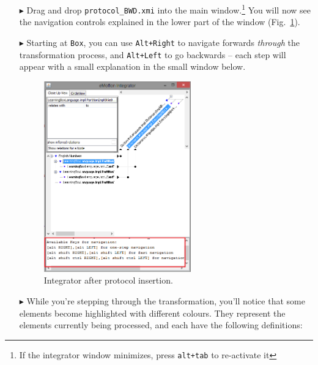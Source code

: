 \begin{itemize}
\item[$\blacktriangleright$] Drag and drop \texttt{protocol\_BWD.xmi} into the main window.\footnote{If the integrator window minimizes, press \texttt{alt+tab}
to re-activate it} You will now see the navigation controls explained in the lower part of the window (Fig.~\ref{fig:integrator_after_protocol}).

\vspace{0.5cm}

\item[$\blacktriangleright$]  Starting at \texttt{Box}, you can use \texttt{Alt+Right} to navigate forwards \emph{through} the transformation process, and
\texttt{Alt+Left} to go backwards -- each step will appear with a small explanation in the small window below.

\newpage

\begin{figure}[h!]
\begin{center}
  \includegraphics[width=0.6\textwidth]{integrator_after_protocol_insertion.png}
  \caption{Integrator after protocol insertion.}
  \label{fig:integrator_after_protocol}
\end{center}
\end{figure} 

\item[$\blacktriangleright$] While you're stepping through the transformation, you'll notice that some elements become highlighted with different colours. They
represent the elements currently being processed, and each have the following definitions:


\end{itemize}
